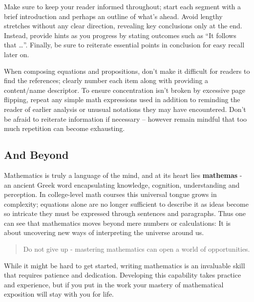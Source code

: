 \documentclass[
  twoside,
  12pt,
  letterpaper,
  fleqn]{article}
\begin{document}
Make sure to keep your reader informed throughout; start each segment
with a brief introduction and perhaps an outline of what's ahead. Avoid
lengthy stretches without any clear direction, revealing key conclusions
only at the end. Instead, provide hints as you progress by stating
outcomes such as ``It follows that \ldots{}''. Finally, be sure to
reiterate essential points in conclusion for easy recall later on.

When composing equations and propositions, don't make it difficult for
readers to find the references; clearly number each item along with
providing a content/name descriptor. To ensure concentration isn't
broken by excessive page flipping, repeat any simple math expressions
used in addition to reminding the reader of earlier analysis or unusual
notations they may have encountered. Don't be afraid to reiterate
information if necessary -- however remain mindful that too much
repetition can become exhausting.

\hypertarget{and-beyond}{%
\subsection{And Beyond}\label{and-beyond}}

Mathematics is truly a language of the mind, and at its heart lies
\textbf{mathemas} - an ancient Greek word encapsulating knowledge,
cognition, understanding and perception. In college-level math courses
this universal tongue grows in complexity; equations alone are no longer
sufficient to describe it as ideas become so intricate they must be
expressed through sentences and paragraphs. Thus one can see that
mathematics moves beyond mere numbers or calculations: It is about
uncovering new ways of interpreting the universe around us.

\begin{quote}
Do not give up - mastering mathematics can open a world of
opportunities.
\end{quote}

While it might be hard to get started, writing mathematics is an
invaluable skill that requires patience and dedication. Developing this
capability takes practice and experience, but if you put in the work
your mastery of mathematical exposition will stay with you for life.


\printbibliography



\thispagestyle{empty}
\end{document}
